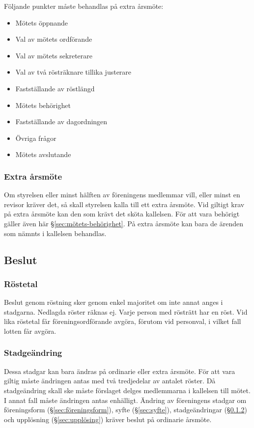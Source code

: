 Följande punkter måste behandlas på extra årsmöte:
\begin{itemize}
    \item Mötets öppnande
    \item Val av mötets ordförande
    \item Val av mötets sekreterare
    \item Val av två rösträknare tillika justerare
    \item Fastställande av röstlängd
    \item Mötets behörighet
    \item Fastställande av dagordningen
    \item Övriga frågor
    \item Mötets avslutande
\end{itemize}

\subsubsection{Extra årsmöte}
Om styrelsen eller minst hälften av föreningens medlemmar vill, eller minst en revisor kräver det, så skall styrelsen kalla till ett extra årsmöte. Vid giltigt krav på extra årsmöte kan den som krävt det sköta kallelsen. För att vara behörigt gäller även här §\ref{sec:mötets-behörighet}. På extra årsmöte kan bara de ärenden som nämnts i kallelsen behandlas.

\subsection{Beslut}

\subsubsection{Röstetal}
Beslut genom röstning sker genom enkel majoritet om inte annat anges i stadgarna. Nedlagda röster räknas ej. Varje person med rösträtt har en röst. Vid lika röstetal får föreningsordförande avgöra, förutom vid personval, i vilket fall lotten får avgöra.

\subsubsection{Stadgeändring} \label{sec:stadgeändringar}
Dessa stadgar kan bara ändras på ordinarie eller extra årsmöte. För att vara giltig måste ändringen antas med två tredjedelar av antalet röster. Då stadgeändring skall ske måste förslaget delges medlemmarna i kallelsen till mötet. I annat fall måste ändringen antas enhälligt. Ändring av föreningens stadgar om föreningsform (§\ref{sec:föreningsform}), syfte (§\ref{sec:syfte}), stadgeändringar (§\ref{sec:stadgeändringar}) och upplösning (§\ref{sec:upplösing}) kräver beslut på ordinarie årsmöte.

